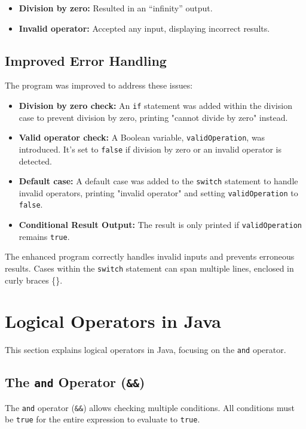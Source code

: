 \documentclass{article}
\begin{document}
\begin{itemize}
    \item \textbf{Division by zero:} Resulted in an ``infinity'' output.
    \item \textbf{Invalid operator:} Accepted any input, displaying incorrect results.
\end{itemize}

\subsection{Improved Error Handling}

The program was improved to address these issues:

\begin{itemize}
    \item \textbf{Division by zero check:} An \texttt{if} statement was added within the division case to prevent division by zero, printing "cannot divide by zero" instead.
    \item \textbf{Valid operator check:} A Boolean variable, \texttt{validOperation}, was introduced.  It's set to \texttt{false} if division by zero or an invalid operator is detected.
    \item \textbf{Default case:} A default case was added to the \texttt{switch} statement to handle invalid operators, printing "invalid operator" and setting \texttt{validOperation} to \texttt{false}.
    \item \textbf{Conditional Result Output:} The result is only printed if \texttt{validOperation} remains \texttt{true}.
\end{itemize}

The enhanced program correctly handles invalid inputs and prevents erroneous results.  Cases within the \texttt{switch} statement can span multiple lines, enclosed in curly braces \{\}.


\section{Logical Operators in Java}

This section explains logical operators in Java, focusing on the \texttt{and} operator.

\subsection{The \texttt{and} Operator (\texttt{\&\&})}

The \texttt{and} operator (\texttt{\&\&}) allows checking multiple conditions.  All conditions must be \texttt{true} for the entire expression to evaluate to \texttt{true}.
\end{document}
